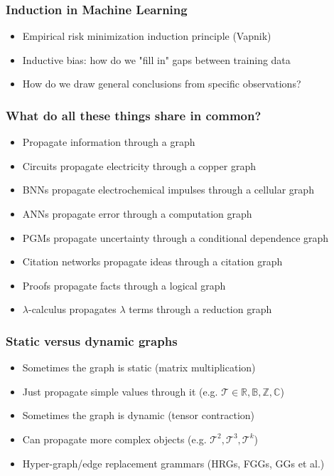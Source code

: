 \documentclass{beamer}
\begin{document}
  \begin{frame}
    \frametitle{Induction in Machine Learning}
    \begin{itemize}
      \item Empirical risk minimization induction principle (Vapnik)
      \item Inductive bias: how do we "fill in" gaps between training data
      \item How do we draw general conclusions from specific observations?
    \end{itemize}
  \end{frame}

  \begin{frame}
    \frametitle{What do all these things share in common?}
    \begin{itemize}
      \item Propagate information through a graph
      \item Circuits propagate electricity through a copper graph
      \item BNNs propagate electrochemical impulses through a cellular graph
      \item ANNs propagate error through a computation graph
      \item PGMs propagate uncertainty through a conditional dependence graph
      \item Citation networks propagate ideas through a citation graph
      \item Proofs propagate facts through a logical graph
      \item $\lambda$-calculus propagates $\lambda$ terms through a reduction graph
    \end{itemize}
  \end{frame}

  \begin{frame}
    \frametitle{Static versus dynamic graphs}
    \begin{itemize}
      \item Sometimes the graph is static (matrix multiplication)
      \item Just propagate simple values through it (e.g. $\mathcal{T} \in {\mathbb{R, B, Z, C}}$)
      \item Sometimes the graph is dynamic (tensor contraction)
      \item Can propagate more complex objects (e.g. $\mathcal{T}^2, \mathcal{T}^3, \mathcal{T}^k$)
      \item Hyper-graph/edge replacement grammars (HRGs, FGGs, GGs et al.)
    \end{itemize}
  \end{frame}
\end{document}
